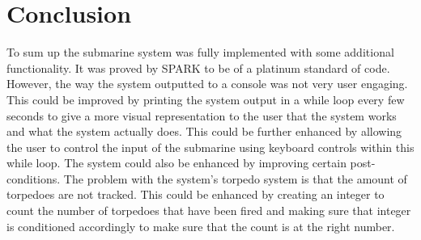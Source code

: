 \section{Conclusion}
To sum up the submarine system was fully implemented with some additional functionality. It was proved by SPARK to be of a platinum standard of code. However, the way the system outputted to a console was not very user engaging. This could be improved by printing the system output in a while loop every few seconds to give a more visual representation to the user that the system works and what the system actually does. This could be further enhanced by allowing the user to control the input of the submarine using keyboard controls within this while loop. The system could also be enhanced by improving certain post-conditions. The problem with the system's torpedo system is that the amount of torpedoes are not tracked. This could be enhanced by creating an integer to count the number of torpedoes that have been fired and making sure that integer is conditioned accordingly to make sure that the count is at the right number.